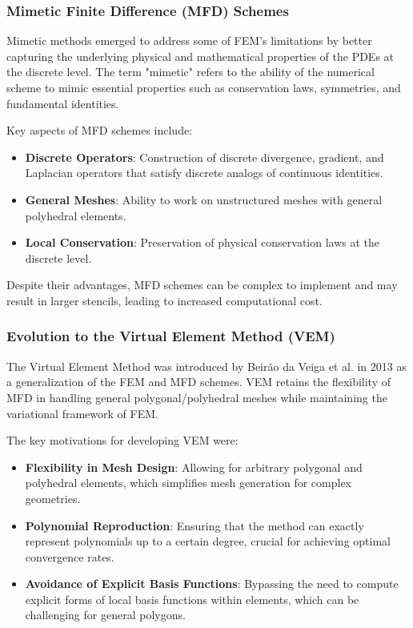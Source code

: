 \documentclass[class=article, crop=false]{standalone}
\begin{document}
\subsubsection{Mimetic Finite Difference (MFD) Schemes}

Mimetic methods emerged to address some of FEM's limitations by better capturing the underlying physical and mathematical properties of the PDEs at the discrete level. The term "mimetic" refers to the ability of the numerical scheme to mimic essential properties such as conservation laws, symmetries, and fundamental identities.

Key aspects of MFD schemes include:

\begin{itemize}
    \item \textbf{Discrete Operators}: Construction of discrete divergence, gradient, and Laplacian operators that satisfy discrete analogs of continuous identities.
    \item \textbf{General Meshes}: Ability to work on unstructured meshes with general polyhedral elements.
    \item \textbf{Local Conservation}: Preservation of physical conservation laws at the discrete level.
\end{itemize}

Despite their advantages, MFD schemes can be complex to implement and may result in larger stencils, leading to increased computational cost.

\subsubsection{Evolution to the Virtual Element Method (VEM)}

The Virtual Element Method was introduced by Beir\~ao da Veiga et al. in 2013 \cite{beirao2013basic} as a generalization of the FEM and MFD schemes. VEM retains the flexibility of MFD in handling general polygonal/polyhedral meshes while maintaining the variational framework of FEM.

The key motivations for developing VEM were:

\begin{itemize}
    \item \textbf{Flexibility in Mesh Design}: Allowing for arbitrary polygonal and polyhedral elements, which simplifies mesh generation for complex geometries.
    \item \textbf{Polynomial Reproduction}: Ensuring that the method can exactly represent polynomials up to a certain degree, crucial for achieving optimal convergence rates.
    \item \textbf{Avoidance of Explicit Basis Functions}: Bypassing the need to compute explicit forms of local basis functions within elements, which can be challenging for general polygons.
\end{itemize}
\end{document}
